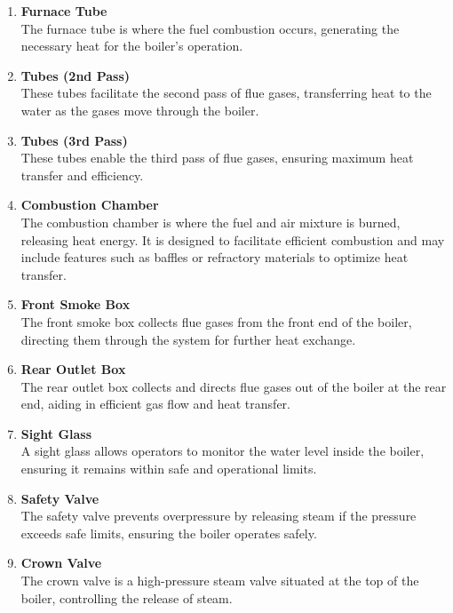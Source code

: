 \begin{enumerate}
    \item \textbf{Furnace Tube}\\
    The furnace tube is where the fuel combustion occurs, generating the necessary heat for the boiler's operation.

    \item \textbf{Tubes (2nd Pass)}\\
    These tubes facilitate the second pass of flue gases, transferring heat to the water as the gases move through the boiler.

    \item \textbf{Tubes (3rd Pass)}\\
    These tubes enable the third pass of flue gases, ensuring maximum heat transfer and efficiency.

    \item \textbf{Combustion Chamber}\\
    The combustion chamber is where the fuel and air mixture is burned, releasing heat energy. It is designed to facilitate efficient combustion and may include features such as baffles or refractory materials to optimize heat transfer.

    \item \textbf{Front Smoke Box}\\
    The front smoke box collects flue gases from the front end of the boiler, directing them through the system for further heat exchange.

    \item \textbf{Rear Outlet Box}\\
    The rear outlet box collects and directs flue gases out of the boiler at the rear end, aiding in efficient gas flow and heat transfer.

    \item \textbf{Sight Glass}\\
    A sight glass allows operators to monitor the water level inside the boiler, ensuring it remains within safe and operational limits.

    \item \textbf{Safety Valve}\\
    The safety valve prevents overpressure by releasing steam if the pressure exceeds safe limits, ensuring the boiler operates safely.

    \item \textbf{Crown Valve}\\
    The crown valve is a high-pressure steam valve situated at the top of the boiler, controlling the release of steam.


\end{enumerate}
